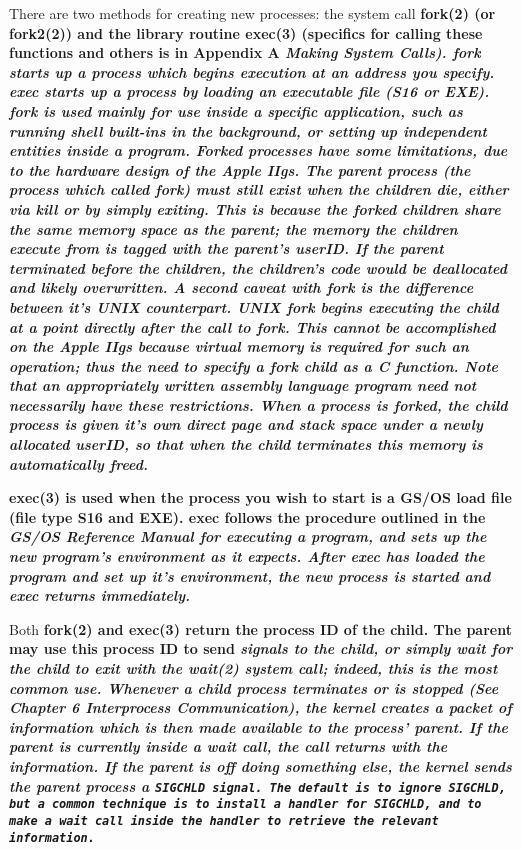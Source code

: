 \documentclass{report}
\begin{document}
There are two methods for creating new
processes: the system call \bf fork\rm(2) 
(or \bf fork2\rm(2))
and the library routine \bf exec\rm(3)
(specifics for calling these functions and others is in Appendix
A \it Making System Calls\rm). \bf fork \rm starts up a process
which begins execution at an address you specify. \bf exec \rm
starts up a process by loading an executable file (S16 or EXE). \bf fork \rm
is used mainly for use inside a specific application, such as
running shell built-ins in the  background, or setting up
independent entities inside a program. Forked processes have some
limitations, due to the hardware design of the Apple IIgs. The
parent process (the process which called fork) must still exist
when the 
children die, either via \bf kill \rm or by simply
exiting. This is because the forked children share the same
memory space as the parent; the memory the children execute from
is tagged with the parent's userID. If the parent terminated
before the children, the children's code would be deallocated and
likely overwritten. A second caveat with \bf fork \rm is the
difference between it's UNIX counterpart. UNIX \bf fork \rm
begins executing the child at a point directly after the call to \bf fork\rm.
This cannot be accomplished on the Apple IIgs because virtual
memory is required for such an operation; thus the need to
specify a \bf fork \rm child as a C function. Note that an
appropriately written 
assembly language program need not
necessarily have these restrictions. When a process is forked,
the child process is given it's own direct page and stack space
under a newly allocated userID, so that when the child terminates
this memory is automatically freed.

\bf exec\rm(3) is used when the process you
wish to start is a GS/OS load file (file type S16 and EXE). \bf exec \rm
follows the procedure outlined in the \it GS/OS Reference Manual \rm
for executing a program, and sets up the new program's
environment as it expects. After \bf exec \rm has loaded the
program and set up it's environment, the new process is started
and \bf exec \rm returns immediately. 

Both \bf fork\rm(2) and \bf exec\rm(3) return
the process ID of the child. The parent may use this process ID
to send \it signals \rm to the child, or simply wait for the child
to exit with the \bf wait\rm(2) system call; indeed, this is the
most common use. Whenever a child process terminates or is
stopped (See Chapter 6 \it Interprocess Communication\rm),
the kernel creates a
packet of information which is then made available to the
process' parent. If the parent is currently inside a wait call,
the call returns with the information. If the parent is off doing
something else, the kernel sends the parent process a 
\tt SIGCHLD \rm signal. The default is to ignore \tt SIGCHLD\rm,
but a common technique is to install a handler for \tt SIGCHLD\rm,
and to make a \bf wait \rm call inside the handler to retrieve
the relevant information.
\end{document}
